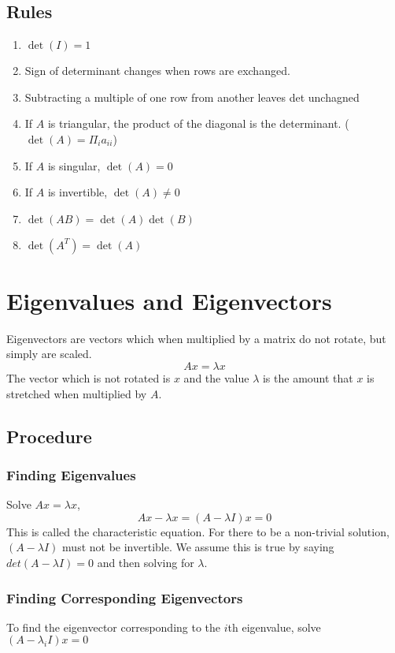 \documentclass[12pt]{article}
\begin{document}
\begin{itemize}
\subsection{Rules}
\begin{enumerate}
\item{$\det(I) = 1$}
\item{Sign of determinant changes when rows are exchanged.}
\item{Subtracting a multiple of one row from another leaves det unchagned}
\item{If $A$ is triangular, the product of the diagonal is the determinant. ($\det(A) = \Pi_{i}a_{ii}$)}
\item{If $A$ is singular, $\det(A) = 0$}
\item{If $A$ is invertible, $\det(A) \neq 0$}
\item{$\det(AB) = \det(A) \det(B)$}
\item{$\det(A^T) = \det(A)$}
\end{enumerate}

\section{Eigenvalues and Eigenvectors}
Eigenvectors are vectors which when multiplied by a matrix do not rotate, but simply are scaled. 
\begin{equation*}
Ax = \lambda x 
\end{equation*}
The vector which is not rotated is $x$ and the value $\lambda$ is the amount that $x$ is stretched when multiplied by $A$.

\subsection{Procedure}
\subsubsection{Finding Eigenvalues}
Solve $Ax = \lambda x$, 
\begin{equation*}
Ax - \lambda x = (A-\lambda I)x = 0 
\end{equation*}
This is called the characteristic equation.  For there to be a non-trivial solution, $(A-\lambda I)$ must not be invertible.  We assume this is true by saying $det(A-\lambda I) = 0$ and then solving for $\lambda$.

\subsubsection{Finding Corresponding Eigenvectors}
To find the eigenvector corresponding to the $i$th eigenvalue, solve $(A-\lambda_i I)x=0$


\end{itemize}
\end{document}
